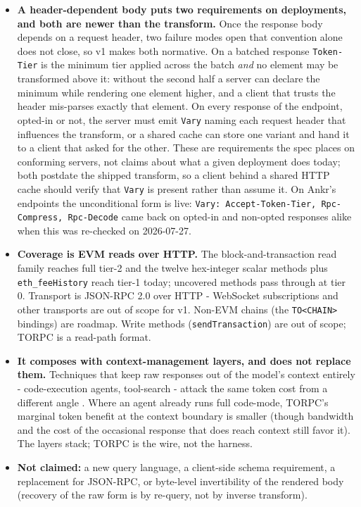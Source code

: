 \documentclass[11pt]{article}
\newcommand{\code}[1]{\texttt{#1}}
\begin{document}
\begin{itemize}[leftmargin=1.4em, itemsep=4pt, topsep=3pt]
\item \textbf{A header-dependent body puts two requirements on deployments, and both are newer than the transform.} Once the response body depends on a request header, two failure modes open that convention alone does not close, so v1 makes both normative. On a batched response \code{Token-Tier} is the minimum tier applied across the batch \emph{and} no element may be transformed above it: without the second half a server can declare the minimum while rendering one element higher, and a client that trusts the header mis-parses exactly that element. On every response of the endpoint, opted-in or not, the server must emit \code{Vary} naming each request header that influences the transform, or a shared cache can store one variant and hand it to a client that asked for the other. These are requirements the spec places on conforming servers, not claims about what a given deployment does today; both postdate the shipped transform, so a client behind a shared HTTP cache should verify that \code{Vary} is present rather than assume it. On Ankr's endpoints the unconditional form is live: \code{Vary: Accept-Token-Tier, Rpc-Compress, Rpc-Decode} came back on opted-in and non-opted responses alike when this was re-checked on 2026-07-27.
\item \textbf{Coverage is EVM reads over HTTP.} The block-and-transaction read family reaches full tier-2 and the twelve hex-integer scalar methods plus \code{eth\_feeHistory} reach tier-1 today; uncovered methods pass through at tier 0. Transport is JSON-RPC 2.0 over HTTP - WebSocket subscriptions and other transports are out of scope for v1. Non-EVM chains (the \code{TO<CHAIN>} bindings) are roadmap. Write methods (\code{sendTransaction}) are out of scope; TORPC is a read-path format.
\item \textbf{It composes with context-management layers, and does not replace them.} Techniques that keep raw responses out of the model's context entirely - code-execution agents, tool-search - attack the same token cost from a different angle \cite{codemode, toolsearch}. Where an agent already runs full code-mode, TORPC's marginal token benefit at the context boundary is smaller (though bandwidth and the cost of the occasional response that does reach context still favor it). The layers stack; TORPC is the wire, not the harness.
\item \textbf{Not claimed:} a new query language, a client-side schema requirement, a replacement for JSON-RPC, or byte-level invertibility of the rendered body (recovery of the raw form is by re-query, not by inverse transform).
\end{itemize}
\end{document}

